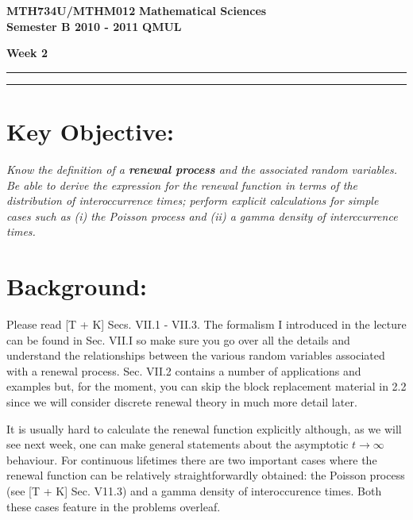 \documentclass[11pt,a4paper]{article}
\begin{document}
  \textbf{MTH734U/MTHM012} \hfill \textbf{Mathematical Sciences}\\
  \textbf{Semester B 2010 - 2011} \hfill \textbf{QMUL}
  \begin{center}
    \textbf{\huge Week 2}
  \end{center}
  \hrule \vspace{2mm} \hrule
  \section*{Key Objective:}
  \textit{Know the definition of a \textbf{renewal process} and the associated random variables. Be able to derive the expression for the renewal function in terms of the distribution of interoccurrence times; perform explicit calculations for simple cases such as (i) the Poisson process and (ii) a gamma density of interccurrence times.}
  \section*{Background:}
  Please read [T + K] Secs. VII.1 - VII.3. The formalism I introduced in the lecture can be found in Sec. VII.I so make sure you go over all the details and understand the relationships between the various random variables associated with a renewal process. Sec. VII.2 contains a number of applications and examples but, for the moment, you can skip the block replacement material in 2.2 since we will consider discrete renewal theory in much more detail later.\par
  It is usually hard to calculate the renewal function explicitly although, as we will see next week, one can make general statements about the asymptotic $t \to \infty$ behaviour. For continuous lifetimes there are two important cases where the renewal function can be relatively straightforwardly obtained: the Poisson process (see [T + K] Sec. V11.3) and a gamma density of interoccurence times. Both these cases feature in the problems overleaf.
  \newpage
\end{document}

